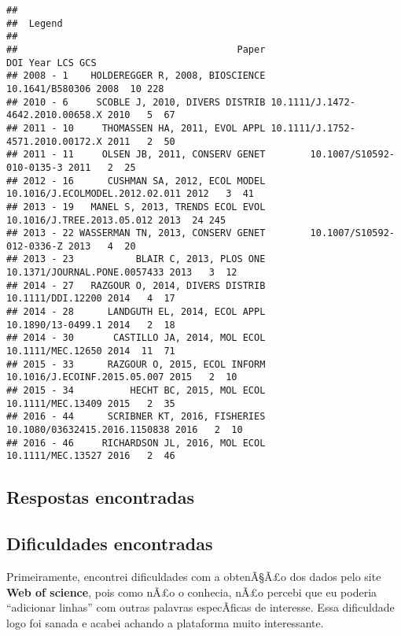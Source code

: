 \documentclass[]{article}
\begin{document}
\begin{verbatim}
## 
##  Legend
## 
##                                       Paper                              DOI Year LCS GCS
## 2008 - 1    HOLDEREGGER R, 2008, BIOSCIENCE                  10.1641/B580306 2008  10 228
## 2010 - 6     SCOBLE J, 2010, DIVERS DISTRIB 10.1111/J.1472-4642.2010.00658.X 2010   5  67
## 2011 - 10     THOMASSEN HA, 2011, EVOL APPL 10.1111/J.1752-4571.2010.00172.X 2011   2  50
## 2011 - 11     OLSEN JB, 2011, CONSERV GENET        10.1007/S10592-010-0135-3 2011   2  25
## 2012 - 16      CUSHMAN SA, 2012, ECOL MODEL  10.1016/J.ECOLMODEL.2012.02.011 2012   3  41
## 2013 - 19   MANEL S, 2013, TRENDS ECOL EVOL       10.1016/J.TREE.2013.05.012 2013  24 245
## 2013 - 22 WASSERMAN TN, 2013, CONSERV GENET        10.1007/S10592-012-0336-Z 2013   4  20
## 2013 - 23           BLAIR C, 2013, PLOS ONE     10.1371/JOURNAL.PONE.0057433 2013   3  12
## 2014 - 27   RAZGOUR O, 2014, DIVERS DISTRIB                10.1111/DDI.12200 2014   4  17
## 2014 - 28      LANDGUTH EL, 2014, ECOL APPL                10.1890/13-0499.1 2014   2  18
## 2014 - 30       CASTILLO JA, 2014, MOL ECOL                10.1111/MEC.12650 2014  11  71
## 2015 - 33      RAZGOUR O, 2015, ECOL INFORM     10.1016/J.ECOINF.2015.05.007 2015   2  10
## 2015 - 34          HECHT BC, 2015, MOL ECOL                10.1111/MEC.13409 2015   2  35
## 2016 - 44      SCRIBNER KT, 2016, FISHERIES    10.1080/03632415.2016.1150838 2016   2  10
## 2016 - 46     RICHARDSON JL, 2016, MOL ECOL                10.1111/MEC.13527 2016   2  46
\end{verbatim}

\subsection{\texorpdfstring{\textbf{Respostas
encontradas}}{Respostas encontradas}}\label{respostas-encontradas}

\subsection{\texorpdfstring{\textbf{Dificuldades
encontradas}}{Dificuldades encontradas}}\label{dificuldades-encontradas}

Primeiramente, encontrei dificuldades com a obtenÃ§Ã£o dos dados pelo
site \textbf{Web of science}, pois como nÃ£o o conhecia, nÃ£o percebi
que eu poderia ``adicionar linhas'' com outras palavras especÃ­ficas de
interesse. Essa dificuldade logo foi sanada e acabei achando a
plataforma muito interessante.
\end{document}

